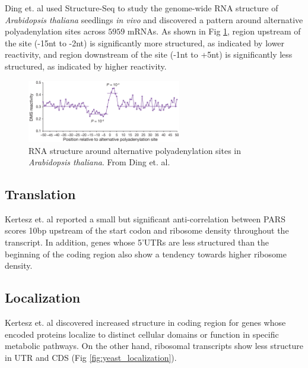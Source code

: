 \documentclass{proposal}
\begin{document}
Ding et. al\cite{ding2014vivo} used Structure-Seq to study the genome-wide RNA structure of
﻿\textit{Arabidopsis thaliana} seedlings \textit{in vivo} and discovered a pattern around alternative polyadenylation sites across $5959$ mRNAs.
As shown in Fig \ref{fig:poly_a}, region upstream of the site (-15nt to -2nt) is significantly more structured, as indicated by lower reactivity,
and region downstream of the site (-1nt to +5nt) is significantly less structured, as indicated by higher reactivity.


\begin{figure}[h!]
    \centering
    \includegraphics[width=0.6\textwidth]{poly_a.png}
    \caption{RNA structure around alternative polyadenylation sites in ﻿\textit{Arabidopsis thaliana}. From Ding et. al\cite{ding2014vivo}.}
    \label{fig:poly_a}
    \centering
\end{figure}





\subsection*{Translation}

Kertesz et. al\cite{kertesz2010genome} reported a small but significant anti-correlation between PARS scores 10bp upstream
of the start codon and ribosome density throughout the transcript.
In addition, genes whose 5'UTRs are less structured than the beginning of the coding region also show a tendency towards higher ribosome density.

\subsection*{Localization}

Kertesz et. al\cite{kertesz2010genome} discovered increased structure in coding region for genes
whose encoded proteins localize to distinct cellular domains or function in specific metabolic pathways.
On the other hand, ribosomal transcripts show less structure in UTR and CDS (Fig \ref{fig:yeast_localization}).
\end{document}

